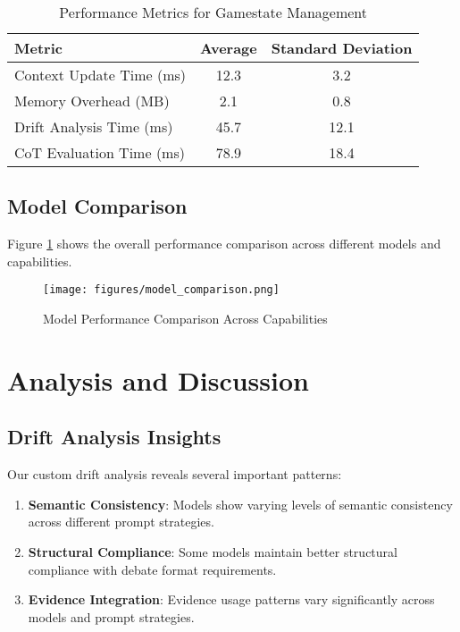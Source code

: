 \documentclass[11pt]{article}
\begin{document}
\begin{table}[h]
\centering
\caption{Performance Metrics for Gamestate Management}
\label{tab:performance}
\begin{tabular}{lcc}
\toprule
Metric & Average & Standard Deviation \\
\midrule
Context Update Time (ms) & 12.3 & 3.2 \\
Memory Overhead (MB) & 2.1 & 0.8 \\
Drift Analysis Time (ms) & 45.7 & 12.1 \\
CoT Evaluation Time (ms) & 78.9 & 18.4 \\
\bottomrule
\end{tabular}
\end{table}

\subsection{Model Comparison}

Figure \ref{fig:model_comparison} shows the overall performance comparison across different models and capabilities.

\begin{figure}[h]
\centering
\texttt{[image: figures/model\_comparison.png]}
\caption{Model Performance Comparison Across Capabilities}
\label{fig:model_comparison}
\end{figure}

\section{Analysis and Discussion}

\subsection{Drift Analysis Insights}

Our custom drift analysis reveals several important patterns:

\begin{enumerate}
    \item \textbf{Semantic Consistency}: Models show varying levels of semantic consistency across different prompt strategies.
    \item \textbf{Structural Compliance}: Some models maintain better structural compliance with debate format requirements.
    \item \textbf{Evidence Integration}: Evidence usage patterns vary significantly across models and prompt strategies.
\end{enumerate}
\end{document}

